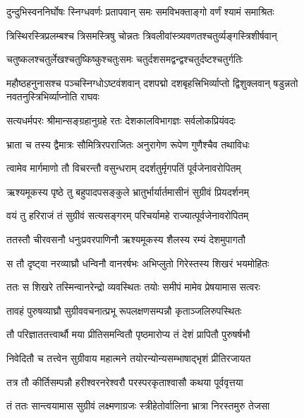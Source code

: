 \twolineshloka
{दुन्दुभिस्वननिर्घोषः स्निग्धवर्णः प्रतापवान्}
{समः समविभक्ताङ्गो वर्णं श्यामं समाश्रितः} %

\twolineshloka
{त्रिस्थिरस्त्रिप्रलम्बश्च त्रिसमस्त्रिषु चोन्नतः}
{त्रिवलीवांस्त्र्यवणतश्चतुर्व्यङ्गस्त्रिशीर्षवान्} %

\twolineshloka
{चतुष्कलश्चतुर्लेखश्चतुष्किष्कुश्चतुःसमः}
{चतुर्दशसमद्वन्द्वश्चतुर्दष्टश्चतुर्गतिः} %

\threelineshloka
{महौष्ठहनुनासश्च पञ्चस्निग्धोऽष्टवंशवान्}
{दशपद्मो दशबृहत्त्रिभिर्व्याप्तो द्विशुक्लवान्}
{षडुन्नतो नवतनुस्त्रिभिर्व्याप्नोति राघवः} %

\twolineshloka
{सत्यधर्मपरः श्रीमान्सङ्ग्रहानुग्रहे रतः}
{देशकालविभागज्ञः सर्वलोकप्रियंवदः} %

\twolineshloka
{भ्राता च तस्य द्वैमात्रः सौमित्रिरपराजितः}
{अनुरागेण रूपेण गुणैश्चैव तथाविधः} %

\twolineshloka
{त्वामेव मार्गमाणो तौ विचरन्तौ वसुन्धराम्}
{ददर्शतुर्मृगपतिं पूर्वजेनावरोपितम्} %

\twolineshloka
{ऋश्यमूकस्य पृष्ठे तु बहुपादपसङ्कुले}
{भ्रातुर्भार्यार्तमासीनं सुग्रीवं प्रियदर्शनम्} %

\twolineshloka
{वयं तु हरिराजं तं सुग्रीवं सत्यसङ्गरम्}
{परिचर्यामहे राज्यात्पूर्वजेनावरोपितम्} %

\twolineshloka
{ततस्तौ चीरवसनौ धनुःप्रवरपाणिनौ}
{ऋश्यमूकस्य शैलस्य रम्यं देशमुपागतौ} %

\twolineshloka
{स तौ दृष्ट्वा नरव्याघ्रौ धन्विनौ वानरर्षभः}
{अभिप्लुतो गिरेस्तस्य शिखरं भयमोहितः} %

\twolineshloka
{ततः स शिखरे तस्मिन्वानरेन्द्रो व्यवस्थितः}
{तयोः समीपं मामेव प्रेषयामास सत्वरः} %

\twolineshloka
{तावहं पुरुषव्याघ्रौ सुग्रीववचनात्प्रभू}
{रूपलक्षणसम्पन्नौ कृताञ्जलिरुपस्थितः} %

\twolineshloka
{तौ परिज्ञाततत्त्वार्थौ मया प्रीतिसमन्वितौ}
{पृष्ठमारोप्य तं देशं प्रापितौ पुरुषर्षभौ} %

\twolineshloka
{निवेदितौ च तत्त्वेन सुग्रीवाय महात्मने}
{तयोरन्योन्यसम्भाषाद्भृशं प्रीतिरजायत} %

\twolineshloka
{तत्र तौ कीर्तिसम्पन्नौ हरीश्वरनरेश्वरौ}
{परस्परकृताश्वासौ कथया पूर्ववृत्तया} %

\twolineshloka
{तं ततः सान्त्वयामास सुग्रीवं लक्ष्मणाग्रजः}
{स्त्रीहेतोर्वालिना भ्रात्रा निरस्तमुरु तेजसा} %


